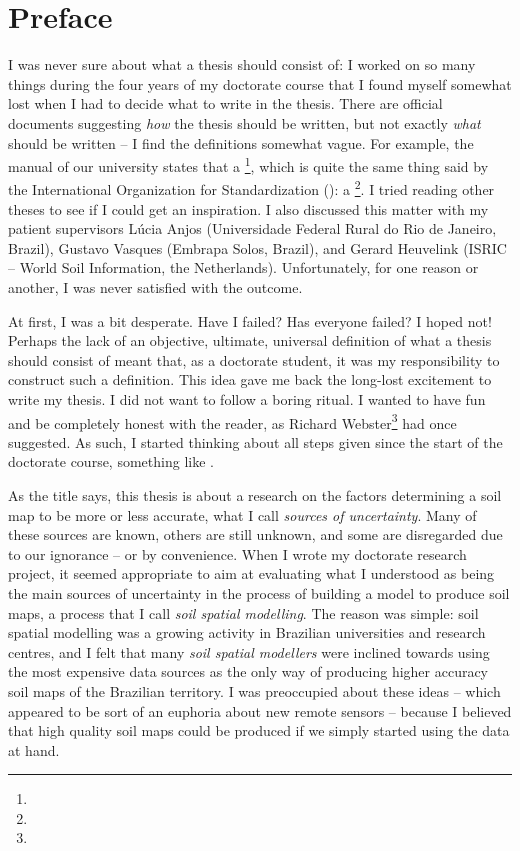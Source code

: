 \chapter*{Preface}

I was never sure about what a thesis should consist of: I worked on so many things during the four years of 
my doctorate course that I found myself somewhat lost when I had to decide what to write in the thesis. There 
are official documents suggesting \emph{how} the thesis should be written, but not exactly \emph{what} should 
be written -- I find the definitions somewhat vague. For example, the manual of our university states that a 
\footnote{}, which is quite the same thing said by the 
International Organization for Standardization (\iso): a \footnote{}. I tried reading other theses to see if I could get an 
inspiration. I also discussed this matter with my patient supervisors Lúcia Anjos 
(Universidade Federal Rural do Rio de Janeiro, Brazil), Gustavo Vasques (Embrapa Solos, Brazil), and 
Gerard Heuvelink (ISRIC -- World Soil Information, the Netherlands). Unfortunately, for one reason or 
another, I was never satisfied with the outcome.

At first, I was a bit desperate. Have I failed? Has everyone failed? I hoped not! Perhaps the lack of an 
objective, ultimate, universal definition of what a thesis should consist of meant that, as a doctorate 
student, it was my responsibility to construct such a definition. This idea gave me back the long-lost 
excitement to write my thesis. I did not want to follow a boring ritual. I wanted to have fun and be 
completely honest with the reader, as Richard Webster\footnote{} had once suggested. 
As such, I started thinking about all steps given since the start of the doctorate course, something like 
.

As the title says, this thesis is about a research on the factors determining a soil map to be more or less 
accurate, what I call \emph{sources of uncertainty}. Many of these sources are known, others are still unknown, 
and some are disregarded due to our ignorance -- or by convenience. When I wrote my doctorate research project, 
it seemed appropriate to aim at evaluating what I understood as being the main sources of uncertainty in the 
process of building a model to produce soil maps, a process that I call \emph{soil spatial modelling}. The 
reason was simple: soil spatial modelling was a growing activity in Brazilian universities and research 
centres, and I felt that many \emph{soil spatial modellers} were inclined towards using the most expensive data 
sources as the only way of producing higher accuracy soil maps of the Brazilian territory. I was preoccupied 
about these ideas -- which appeared to be sort of an euphoria about new remote sensors -- because I believed 
that high quality soil maps could be produced if we simply started using the data at hand.

